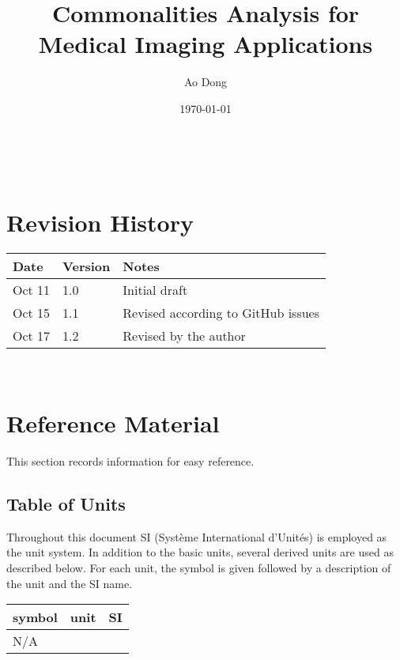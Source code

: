 \documentclass[12pt]{article}
\begin{document}
\title{Commonalities Analysis for Medical Imaging Applications} 
\author{Ao Dong}
\date{\today}

\maketitle

~\newpage


\section{Revision History}

\begin{tabularx}{\textwidth}{p{3cm}p{2cm}X}
\toprule {\bf Date} & {\bf Version} & {\bf Notes}\\
\midrule
Oct 11 & 1.0 & Initial draft\\
Oct 15 & 1.1 & Revised according to GitHub issues\\
Oct 17 & 1.2 & Revised by the author\\
\bottomrule
\end{tabularx}

~\newpage
	
\section{Reference Material}

This section records information for easy reference.

\subsection{Table of Units}

Throughout this document SI (Syst\`{e}me International d'Unit\'{e}s) is employed
as the unit system.  In addition to the basic units, several derived units are
used as described below.  For each unit, the symbol is given followed by a
description of the unit and the SI name.
~\newline

\renewcommand{\arraystretch}{1.2}
  \noindent \begin{tabular}{l l l} 
    \toprule		
    \textbf{symbol} & \textbf{unit} & \textbf{SI}\\
    \midrule 
    N/A\\
    \bottomrule
  \end{tabular}
\end{document}

